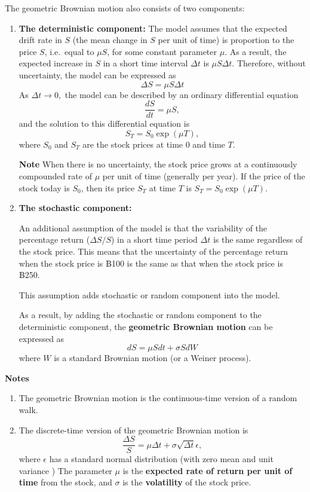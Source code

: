 \documentclass[
]{book}
\theoremstyle{definition}
\theoremstyle{definition}
\theoremstyle{definition}
\theoremstyle{definition}
\theoremstyle{remark}
\begin{document}
The geometric Brownian motion also consists of two components:

\begin{enumerate}
\def\labelenumi{\arabic{enumi}.}
\item
  \textbf{The deterministic component:} The model assumes that the expected
  drift rate in \(S\) (the mean change in \(S\) per unit of time) is
  proportion to the price \(S\), i.e.~equal to \(\mu S\), for some
  constant parameter \(\mu\). As a result, the expected increase in \(S\)
  in a short time interval \(\Delta t\) is \(\mu S \Delta t\). Therefore,
  without uncertainty, the model can be expressed as
  \[\Delta S = \mu S \Delta t\] As \(\Delta t \rightarrow 0,\) the model
  can be described by an ordinary differential equation
  \[\frac{dS}{dt} = \mu S,\] and the solution to this differential
  equation is \[S_{T} = S_0 \exp(\mu T),\] where \(S_0\) and \(S_T\) are
  the stock prices at time 0 and time \(T\).

  \textbf{Note} When there is no uncertainty, the stock price grows at a
  continuously compounded rate of \(\mu\) per unit of time (generally
  per year). If the price of the stock today is \(S_0\), then its price
  \(S_T\) at time \(T\) is \(S_{T} = S_0 \exp(\mu T)\).
\item
  \textbf{The stochastic component:}

  An additional assumption of the model is that the variability of the
  percentage return (\(\Delta S/S\)) in a short time period \(\Delta t\)
  is the same regardless of the stock price. This means that the
  uncertainty of the percentage return when the stock price is ฿100 is
  the same as that when the stock price is ฿250.

  This assumption adds stochastic or random component into the model.

  As a result, by adding the stochastic or random component to the
  deterministic component, the \textbf{geometric Brownian motion} can be
  expressed as \[dS = \mu S dt + \sigma S dW\] where \(W\) is a standard
  Brownian motion (or a Weiner process).
\end{enumerate}

\textbf{Notes}

\begin{enumerate}
\def\labelenumi{\arabic{enumi}.}
\item
  The geometric Brownian motion is the continuous-time version of a
  random walk.
\item
  The discrete-time version of the geometric Brownian motion is
  \[\frac{\Delta S}{S} = \mu \Delta t + \sigma \sqrt{\Delta t} \epsilon,\]
  where \(\epsilon\) has a standard normal distribution (with zero mean
  and unit variance ) The parameter \(\mu\) is the \textbf{expected rate of
  return per unit of time} from the stock, and \(\sigma\) is the
  \textbf{volatility} of the stock price.
\end{enumerate}
\end{document}
